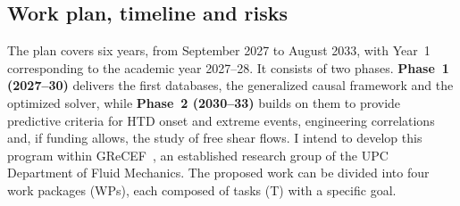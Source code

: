 \documentclass[11pt]{article}
\begin{document}
\subsection{Work plan, timeline and risks}\label{sec:workplan}

The plan covers six years, from September 2027 to August 2033, with Year~1 corresponding to the academic year 2027--28. 
It consists of two phases.
\textbf{Phase~1 (2027--30)} delivers the first databases, the generalized causal framework and the optimized solver, while \textbf{Phase~2 (2030--33)} builds on them to provide predictive criteria for HTD onset and extreme events, engineering correlations and, if funding allows, the study of free shear flows.
I intend to develop this program within GReCEF~\cite{GReCEF}, an established research group of the UPC Department of Fluid Mechanics. 
The proposed work can be divided into four work packages (WPs), each composed of tasks (T) with a specific goal.
\end{document}
